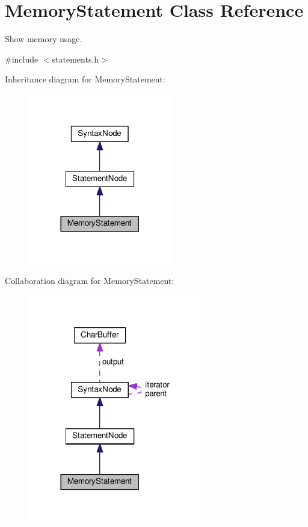 \hypertarget{classMemoryStatement}{}\section{Memory\+Statement Class Reference}
\label{classMemoryStatement}


Show memory usage.  




{\ttfamily \#include $<$statements.\+h$>$}



Inheritance diagram for Memory\+Statement\+:
\nopagebreak
\begin{figure}[H]
\begin{center}
\leavevmode
\includegraphics[width=177pt]{d1/de5/classMemoryStatement__inherit__graph}
\end{center}
\end{figure}


Collaboration diagram for Memory\+Statement\+:
\nopagebreak
\begin{figure}[H]
\begin{center}
\leavevmode
\includegraphics[width=216pt]{d2/d77/classMemoryStatement__coll__graph}
\end{center}
\end{figure}
